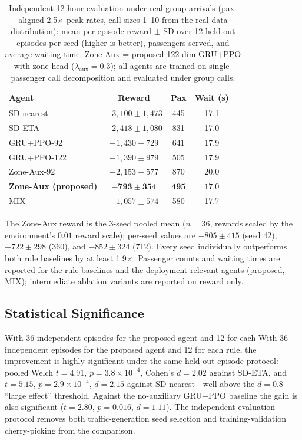 \documentclass[conference]{IEEEtran}
\begin{document}
\begin{table}[t]
\centering
\caption{Independent 12-hour evaluation under real group arrivals
(pax-aligned 2.5$\times$ peak rates, call sizes 1--10 from the
real-data distribution): mean per-episode reward $\pm$ SD over 12
held-out episodes per seed (higher is better), passengers served, and
average waiting time. Zone-Aux = proposed 122-dim GRU+PPO with zone
head ($\lambda_{\text{aux}} = 0.3$); all agents are trained on
single-passenger call decomposition and evaluated under group calls.}
\label{tab:main_results}
\begin{tabular}{@{}lcccc@{}}
\toprule
Agent & Reward & Pax & Wait (s) \\
\midrule
SD-nearest & $-3{,}100 \pm 1{,}473$ & 445 & 17.1 \\
SD-ETA     & $-2{,}418 \pm 1{,}080$ & 831 & 17.0 \\
GRU+PPO-92 & $-1{,}430 \pm 729$ & 641 & 17.9 \\
GRU+PPO-122 & $-1{,}390 \pm 979$ & 505 & 17.9 \\
Zone-Aux-92 & $-2{,}153 \pm 577$ & 870 & 20.0 \\
\textbf{Zone-Aux (proposed)} & $\mathbf{-793 \pm 354}$ &
$\mathbf{495}$ & $\mathbf{17.0}$ \\
MIX & $-1{,}057 \pm 574$ & 580 & 17.7 \\
\bottomrule
\end{tabular}
\end{table}

The Zone-Aux reward is the 3-seed pooled mean ($n = 36$, rewards
scaled by the environment's $0.01$ reward scale); per-seed values are
$-805 \pm 415$ (seed 42), $-722 \pm 298$ (360), and $-852 \pm 324$
(712). Every seed individually outperforms both rule baselines by at
least 1.9$\times$. Passenger counts and waiting times are reported
for the rule baselines and the deployment-relevant agents (proposed,
MIX); intermediate ablation variants are reported on reward only.

\subsection{Statistical Significance}

With 36 independent episodes for the proposed agent and 12 for each
With 36 independent episodes for the proposed agent and 12 for each
rule, the improvement is highly significant under the same held-out
episode protocol: pooled Welch $t = 4.91$, $p = 3.8\times10^{-4}$,
Cohen's $d = 2.02$ against SD-ETA, and $t = 5.15$, $p = 2.9\times
10^{-4}$, $d = 2.15$ against SD-nearest---well above the $d = 0.8$
``large effect'' threshold. Against the no-auxiliary GRU+PPO baseline
the gain is also significant ($t = 2.80$, $p = 0.016$, $d = 1.11$).
The independent-evaluation protocol removes both traffic-generation
seed selection and training-validation cherry-picking from the
comparison.
\end{document}
